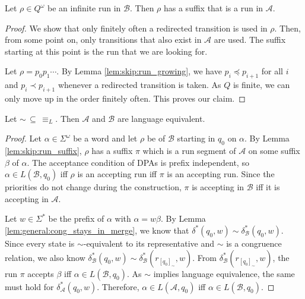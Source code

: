 \begin{lem}
\label{lem:skip:run_suffix}
	Let $\rho \in Q^\omega$ be an infinite run in $\mathcal{B}$. Then $\rho$ has a suffix that is a run in $\mathcal{A}$.
\end{lem} 

\begin{proof}
	We show that only finitely often a redirected transition is used in $\rho$. Then, from some point on, only transitions that also exist in $\mathcal{A}$ are used. The suffix starting at this point is the run that we are looking for.
	
	Let $\rho = p_0 p_1 \cdots$. By Lemma \ref{lem:skip:run_growing}, we have $p_i \preceq p_{i+1}$ for all $i$ and $p_i \prec p_{i+1}$ whenever a redirected transition is taken. As $Q$ is finite, we can only move up in the order finitely often. This proves our claim.
\end{proof}


\begin{theorem}
	Let $\sim \,\subseteq\, \equiv_L$. Then $\mathcal{A}$ and $\mathcal{B}$ are language equivalent.
\label{thm:skip:lang_equiv}
\end{theorem}

\begin{proof}
	Let $\alpha \in \Sigma^\omega$ be a word and let $\rho$ be of $\mathcal{B}$ starting in $q_0$ on $\alpha$. By Lemma \ref{lem:skip:run_suffix}, $\rho$ has a suffix $\pi$ which is a run segment of $\mathcal{A}$ on some suffix $\beta$ of $\alpha$. The acceptance condition of DPAs is prefix independent, so $\alpha \in L(\mathcal{B}, q_0)$ iff $\rho$ is an accepting run iff $\pi$ is an accepting run. Since the priorities do not change during the construction, $\pi$ is accepting in $\mathcal{B}$ iff it is accepting in $\mathcal{A}$.
	
	Let $w \in \Sigma^*$ be the prefix of $\alpha$ with $\alpha = w \beta$. By Lemma \ref{lem:general:cong_stays_in_merge}, we know that $\delta^*(q_0, w) \sim \delta^*_\mathcal{B}(q_0, w)$. Since every state is $\sim$-equivalent to its representative and $\sim$ is a congruence relation, we also know $\delta^*_\mathcal{B}(q_0, w) \sim \delta^*_\mathcal{B}(r_{[q_0]_\sim}, w)$. From $\delta^*_\mathcal{B}(r_{[q_0]_\sim}, w)$, the run $\pi$ accepts $\beta$ iff $\alpha \in L(\mathcal{B}, q_0)$. As $\sim$ implies language equivalence, the same must hold for $\delta^*_\mathcal{A}(q_0, w)$. Therefore, $\alpha \in L(\mathcal{A}, q_0)$ iff $\alpha \in L(\mathcal{B}, q_0)$.
\end{proof}

